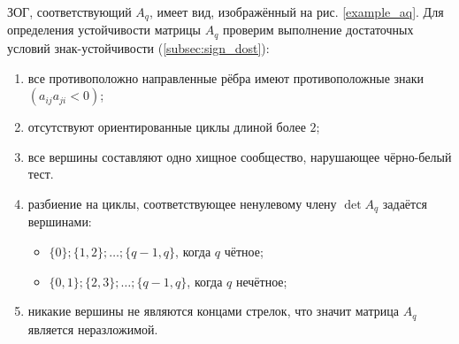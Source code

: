     ЗОГ, соответствующий \(A_q\), имеет вид, изображённый на рис. \ref{example_aq}. Для определения устойчивости матрицы \(A_q\) проверим выполнение достаточных условий знак-устойчивости (\ref{subsec:sign_dost}):
    \begin{enumerate}
        \item все противоположно направленные рёбра имеют противоположные знаки \((a_{ij} a_{ji} < 0)\);
        \item отсутствуют ориентированные циклы длиной более \(2\);
        \item все вершины составляют одно хищное сообщество, нарушающее чёрно-белый тест.
        \item разбиение на циклы, соответствующее ненулевому члену \(\det A_q\) задаётся вершинами:
        \begin{itemize}
            \item \(\{0\}; \{1,2\}; \dots; \{q-1, q\}\), когда \(q\) чётное;
            \item \(\{0, 1\}; \{2,3\}; \dots; \{q-1, q\}\), когда \(q\) нечётное;
        \end{itemize}
        \item никакие вершины не являются концами стрелок, что значит матрица \(A_q\) является неразложимой.
    \end{enumerate}
    
